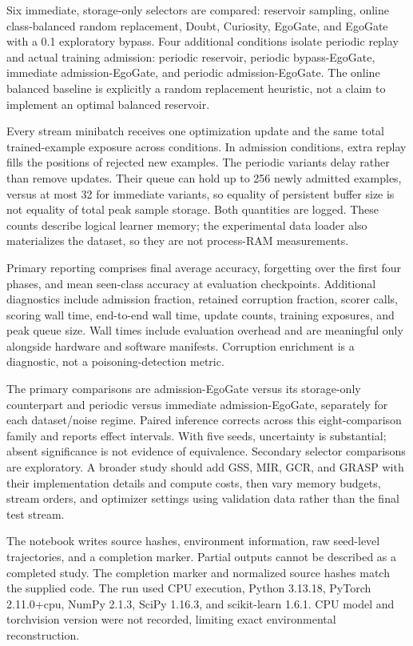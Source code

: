 \documentclass[conference]{IEEEtran}
\begin{document}
Six immediate, storage-only selectors are compared: reservoir sampling, online class-balanced random replacement, Doubt, Curiosity, EgoGate, and EgoGate with a 0.1 exploratory bypass. Four additional conditions isolate periodic replay and actual training admission: periodic reservoir, periodic bypass-EgoGate, immediate admission-EgoGate, and periodic admission-EgoGate. The online balanced baseline is explicitly a random replacement heuristic, not a claim to implement an optimal balanced reservoir.

Every stream minibatch receives one optimization update and the same total trained-example exposure across conditions. In admission conditions, extra replay fills the positions of rejected new examples. The periodic variants delay rather than remove updates. Their queue can hold up to 256 newly admitted examples, versus at most 32 for immediate variants, so equality of persistent buffer size is not equality of total peak sample storage. Both quantities are logged. These counts describe logical learner memory; the experimental data loader also materializes the dataset, so they are not process-RAM measurements.

Primary reporting comprises final average accuracy, forgetting over the first four phases, and mean seen-class accuracy at evaluation checkpoints. Additional diagnostics include admission fraction, retained corruption fraction, scorer calls, scoring wall time, end-to-end wall time, update counts, training exposures, and peak queue size. Wall times include evaluation overhead and are meaningful only alongside hardware and software manifests. Corruption enrichment is a diagnostic, not a poisoning-detection metric.

The primary comparisons are admission-EgoGate versus its storage-only counterpart and periodic versus immediate admission-EgoGate, separately for each dataset/noise regime. Paired inference corrects across this eight-comparison family and reports effect intervals. With five seeds, uncertainty is substantial; absent significance is not evidence of equivalence. Secondary selector comparisons are exploratory. A broader study should add GSS, MIR, GCR, and GRASP with their implementation details and compute costs, then vary memory budgets, stream orders, and optimizer settings using validation data rather than the final test stream.

The notebook writes source hashes, environment information, raw seed-level trajectories, and a completion marker. Partial outputs cannot be described as a completed study. The completion marker and normalized source hashes match the supplied code. The run used CPU execution, Python 3.13.18, PyTorch 2.11.0+cpu, NumPy 2.1.3, SciPy 1.16.3, and scikit-learn 1.6.1. CPU model and torchvision version were not recorded, limiting exact environmental reconstruction.
\end{document}
